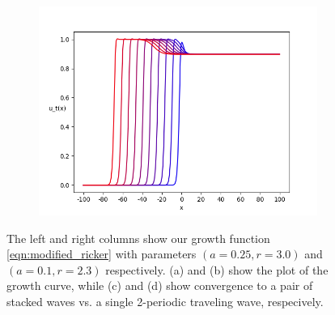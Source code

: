 \documentclass{article}
\theoremstyle{definition}
\numberwithin{equation}{section}
\begin{document}
\begin{figure}
\begin{subfigure}[b]{0.45\textwidth}
  \caption{}
\end{subfigure}
\begin{subfigure}[b]{0.45\textwidth}
  \centering
  \includegraphics[width=\textwidth]{figures/fig3f.png}
  \caption{}
\end{subfigure}
        \caption{The left and right columns show our growth function \eqref{eqn:modified_ricker} with parameters $(a=0.25, r=3.0)$ and $(a=0.1,r=2.3)$ respectively. (a) and (b) show the plot of the growth curve, while (c) and (d) show convergence to a pair of stacked waves vs. a single 2-periodic traveling wave, respecively.}
        \label{fig:modified_ricker_waves}
\end{figure}

\printbibliography
\end{document}
